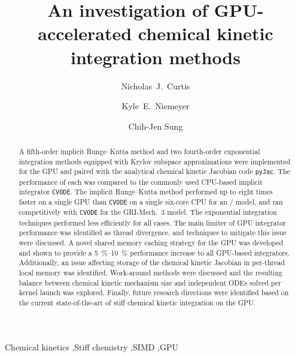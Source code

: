 \documentclass[preprint]{elsarticle}
\begin{document}
\begin{frontmatter}

\title{An investigation of GPU-accelerated chemical kinetic integration methods}

\author[uconn]{Nicholas~J.\ Curtis}
\author[osu]{Kyle~E.\ Niemeyer}
\author[uconn]{Chih-Jen Sung}

\address[uconn]{Department of Mechanical Engineering\\
  University of Connecticut, Storrs, CT, 06269, USA}
\address[osu]{School of Mechanical, Industrial, and Manufacturing Engineering\\
  Oregon State University, Corvallis, OR 97331, USA}
  

\begin{abstract}
A fifth-order implicit Runge--Kutta method and two fourth-order exponential integration methods equipped with Krylov subspace approximations were implemented for the GPU and paired with the analytical chemical kinetic Jacobian code \texttt{pyJac}.
The performance of each was compared to the commonly used CPU-based implicit integrator \texttt{CVODE}.
The implicit Runge--Kutta method performed up to eight times faster on a single GPU than \texttt{CVODE} on a single six-core CPU for an \slash {} model, and ran competitively with \texttt{CVODE} for the GRI-Mech.\ 3 model.
The exponential integration techniques performed less efficiently for all cases.
The main limiter of GPU integrator performance was identified as thread divergence, and techniques to mitigate this issue were discussed.
A novel shared memory caching strategy for the GPU was developed and shown to provide a \SIrange{5}{10}{\percent} performance increase to all GPU-based integrators.
Additionally, an issue affecting storage of the chemical kinetic Jacobian in per-thread local memory was identified.
Work-around methods were discussed and the resulting balance between chemical kinetic mechanism size and independent ODEs solved per kernel launch was explored.
Finally, future research directions were identified based on the current state-of-the-art of stiff chemical kinetic integration on the GPU.
\end{abstract}

\begin{keyword}
 Chemical kinetics \sep Stiff chemistry \sep SIMD \sep GPU
\end{keyword}

\end{frontmatter}
\pagebreak
\end{document}

